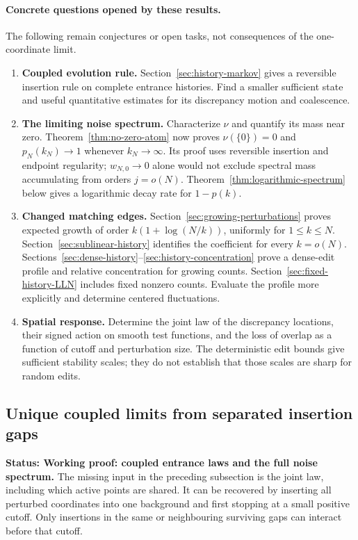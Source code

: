 \documentclass[11pt,letterpaper]{article}
\newcommand{\status}[1]{\textbf{Status: #1.}}
\begin{document}
\paragraph{Concrete questions opened by these results.}
The following remain conjectures or open tasks, not consequences of
the one-coordinate limit.
\begin{enumerate}
\item \textbf{Coupled evolution rule.} Section~\ref{sec:history-markov}
gives a reversible insertion rule on complete entrance histories.
Find a smaller sufficient state and useful quantitative estimates
for its discrepancy motion and coalescence.
\item \textbf{The limiting noise spectrum.} Characterize $\nu$ and
quantify its mass near zero. Theorem~\ref{thm:no-zero-atom} now proves
$\nu(\{0\})=0$ and $p_N(k_N)\to1$ whenever $k_N\to\infty$.
Its proof uses reversible insertion and endpoint regularity;
$w_{N,0}\to0$ alone would not exclude spectral mass accumulating
from orders $j=o(N)$. Theorem~\ref{thm:logarithmic-spectrum} below
gives a logarithmic decay rate for $1-p(k)$.
\item \textbf{Changed matching edges.}
Section~\ref{sec:growing-perturbations} proves expected growth of
order $k(1+\log(N/k))$, uniformly for $1\le k\le N$.
Section~\ref{sec:sublinear-history} identifies the coefficient for
every $k=o(N)$. Sections~\ref{sec:dense-history}--\ref{sec:history-concentration}
prove a dense-edit profile and relative concentration for growing
counts. Section~\ref{sec:fixed-history-LLN} includes fixed nonzero
counts. Evaluate the profile more explicitly and determine centered
fluctuations.
\item \textbf{Spatial response.} Determine the joint law of the
discrepancy locations, their signed action on smooth test functions,
and the loss of overlap as a function of cutoff and perturbation size.
The deterministic edit bounds give sufficient stability scales;
they do not establish that those scales are sharp for random edits.
\end{enumerate}

\subsection{Unique coupled limits from separated insertion gaps}
\label{sec:coupled-limit}

\status{Working proof: coupled entrance laws and the full noise spectrum}
The missing input in the preceding subsection is the joint law, including
which active points are shared. It can be recovered by inserting all
perturbed coordinates into one background and first stopping at a small
positive cutoff. Only insertions in the same or neighbouring surviving
gaps can interact before that cutoff.
\end{document}
